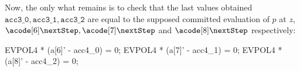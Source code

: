 Now, the only what remains is to check that the last values obtained $\texttt{acc3\_0}, \texttt{acc3\_1}, \texttt{acc3\_2}$ are equal to the supposed committed evaluation of $p$ at $z$, $\acode[6] \nextStep, \acode[7] \nextStep$ and $\acode[8] \nextStep$ respectively:

\begin{pil}
EVPOL4 * (a[6]' - acc4_0) = 0;
EVPOL4 * (a[7]' - acc4_1) = 0;
EVPOL4 * (a[8]' - acc4_2) = 0;
\end{pil}




%
%
%
%
